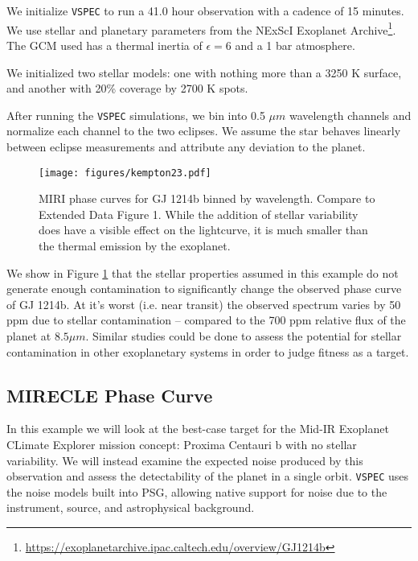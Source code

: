 \documentclass[twocolumn]{aastex631}
\newcommand{\vspec}[1]{\texttt{VSPEC}#1}
\begin{document}
We initialize \vspec{} to run a 41.0 hour observation with a cadence of 15 minutes. We use stellar and planetary parameters
from the NExScI Exoplanet Archive\footnote{\url{https://exoplanetarchive.ipac.caltech.edu/overview/GJ1214b}}.
The GCM used has a thermal inertia of $\epsilon = 6$ and a 1 bar  atmosphere.

We initialized two stellar models: one with nothing more than a 3250 K surface, and another with 20\% coverage by 2700 K spots.

After running the \vspec{} simulations, we bin into 0.5 $\mu m$ wavelength channels and normalize each channel to the two eclipses.
We assume the star behaves linearly between eclipse measurements and attribute any deviation to the planet.

\begin{figure}
    \centering
    \texttt{[image: figures/kempton23.pdf]}
    \caption{
        MIRI phase curves for GJ 1214b binned by wavelength. Compare to \citet{kempton2023} Extended Data Figure 1.
        While the addition of stellar variability does have a visible effect on the lightcurve, it is much smaller than the thermal emission by the exoplanet.
        }
    \label{fig:gj1214b}
\end{figure}

We show in Figure \ref{fig:gj1214b} that the stellar properties assumed in this example do not generate enough contamination to
significantly change the observed phase curve of GJ 1214b. At it's worst (i.e. near transit) the observed spectrum varies by 50 ppm due to stellar
contamination -- compared to the 700 ppm relative flux of the planet at $8.5 {\mu m}$. Similar studies could be done to assess the potential for
stellar contamination in other exoplanetary systems in order to judge fitness as a target.

\subsection{MIRECLE Phase Curve}
In this example we will look at the best-case target for the Mid-IR Exoplanet CLimate Explorer \citep[MIRECLE,][]{mandell2022}
mission concept: Proxima Centauri b with no stellar variability. We will instead examine the expected noise produced by this observation
and assess the detectability of the planet in a single orbit. \vspec{} uses the noise models built into PSG, allowing native support for
noise due to the instrument, source, and astrophysical background.
\end{document}
